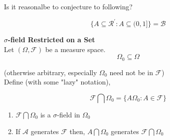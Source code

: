 \documentclass[11pt,fleqn]{book} %
\begin{document}
	Is it reasonalbe to conjecture to following?

	$$\{A \subseteq \mathcal{R}^\prime: A \subseteq (0,1] \} = \mathcal{B} $$


\textbf{$\sigma$-field Restricted on a Set}\\

	Let $(\Omega, \mathcal{F})$ be a measure space.\\

	$$\Omega_0 \subseteq \Omega $$

	(otherwise arbitrary, especially $\Omega_0$ need not be in $\mathcal{F}$)\\

	Define (with some "lazy" notation),

			$$\mathcal{F} \bigcap \Omega_0 = \{A\Omega_0: A\in \mathcal {F} \} $$


\begin{theorem}
	\begin{enumerate}[label = (\roman*)]
		\item $\mathcal{F} \bigcap \Omega_0$ is a $\sigma$-field in $\Omega_0$
		\item If $\mathcal{A}$ generates $\mathcal{F}$ then, $A \bigcap \Omega_0$ generates $\mathcal{F} \bigcap \Omega_0$
	\end{enumerate}
\end{theorem}
\end{document}
